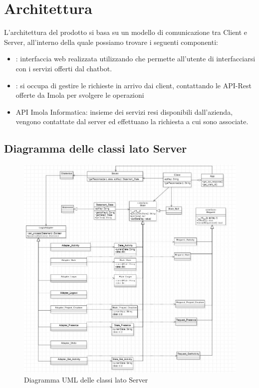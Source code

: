 \section{Architettura}
L'architettura del prodotto si basa su un modello di comunicazione tra Client e Server, all'interno della quale possiamo trovare i seguenti componenti: 
\begin{itemize}
    \item {}: interfaccia web realizzata utilizzando  che permette all'utente di interfacciarsi con i servizi offerti dal chatbot. 
    \item {}: si occupa di gestire le richieste in arrivo dai client, contattando le API-Rest offerte da Imola per svolgere le operazioni
    \item API  Imola Informatica: insieme dei servizi resi disponibili dall'azienda, vengono contattate dal server ed effettuano la richiesta a cui sono associate.  
\end{itemize}



\subsection{Diagramma delle classi lato Server}
	\begin{figure}[H]
	\centering\includegraphics[scale=0.70]{images/diagramma_classi.jpg}
    \caption{Diagramma UML delle classi lato Server}
	\end{figure}

